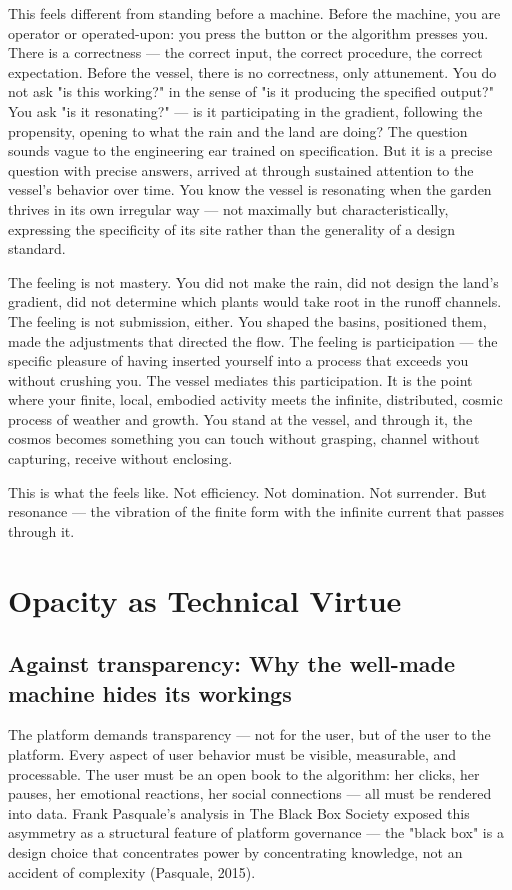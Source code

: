 This feels different from standing before a machine. Before the machine, you are operator or operated-upon: you press the button or the algorithm presses you. There is a correctness — the correct input, the correct procedure, the correct expectation. Before the vessel, there is no correctness, only attunement. You do not ask "is this working?" in the sense of "is it producing the specified output?" You ask "is it resonating?" — is it participating in the gradient, following the propensity, opening to what the rain and the land are doing? The question sounds vague to the engineering ear trained on specification. But it is a precise question with precise answers, arrived at through sustained attention to the vessel's behavior over time. You know the vessel is resonating when the garden thrives in its own irregular way — not maximally but characteristically, expressing the specificity of its site rather than the generality of a design standard.

The feeling is not mastery. You did not make the rain, did not design the land's gradient, did not determine which plants would take root in the runoff channels. The feeling is not submission, either. You shaped the basins, positioned them, made the adjustments that directed the flow. The feeling is participation — the specific pleasure of having inserted yourself into a process that exceeds you without crushing you. The vessel mediates this participation. It is the point where your finite, local, embodied activity meets the infinite, distributed, cosmic process of weather and growth. You stand at the vessel, and through it, the cosmos becomes something you can touch without grasping, channel without capturing, receive without enclosing.

This is what the   feels like. Not efficiency. Not domination. Not surrender. But resonance — the vibration of the finite form with the infinite current that passes through it.

\section{Opacity as Technical Virtue}

\subsection{Against transparency: Why the well-made machine hides its workings}

The platform demands transparency — not for the user, but of the user to the platform. Every aspect of user behavior must be visible, measurable, and processable. The user must be an open book to the algorithm: her clicks, her pauses, her emotional reactions, her social connections — all must be rendered into data. Frank Pasquale's analysis in The Black Box Society exposed this asymmetry as a structural feature of platform governance — the "black box" is a design choice that concentrates power by concentrating knowledge, not an accident of complexity (Pasquale, 2015).

